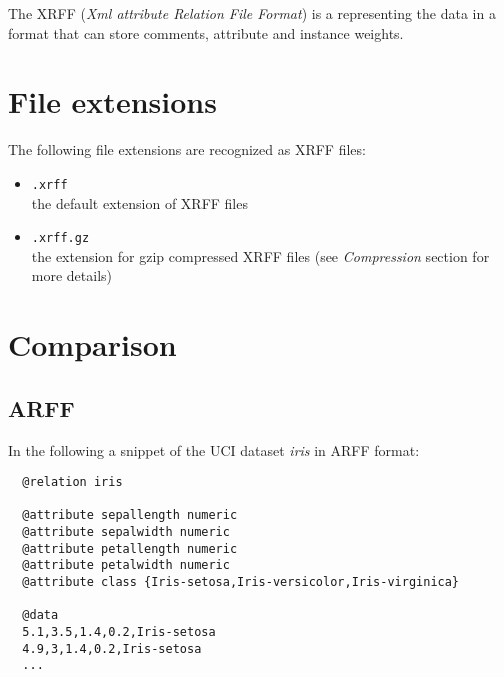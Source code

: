 %
%
%
%


The XRFF (\textit{Xml attribute Relation File Format}) is a representing
the data in a format that can store comments, attribute and instance weights.

\section{File extensions}
The following file extensions are recognized as XRFF files:

\begin{itemize}
	\item \texttt{.xrff} \\
		the default extension of XRFF files
	\item \texttt{.xrff.gz} \\
		the extension for gzip compressed XRFF files (see \textit{Compression} section for more details)
\end{itemize}

\section{Comparison}

\subsection{ARFF}
In the following a snippet of the UCI dataset \textit{iris} in ARFF format:

\begin{verbatim}
  @relation iris

  @attribute sepallength numeric
  @attribute sepalwidth numeric
  @attribute petallength numeric
  @attribute petalwidth numeric
  @attribute class {Iris-setosa,Iris-versicolor,Iris-virginica}

  @data
  5.1,3.5,1.4,0.2,Iris-setosa
  4.9,3,1.4,0.2,Iris-setosa
  ...
\end{verbatim}

